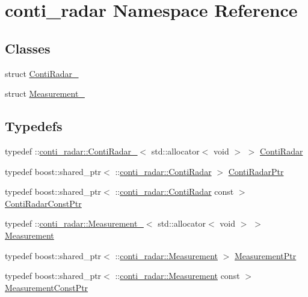 \hypertarget{namespaceconti__radar}{}\section{conti\+\_\+radar Namespace Reference}
\label{namespaceconti__radar}
\subsection*{Classes}
\begin{DoxyCompactItemize}
\item 
struct \hyperlink{structconti__radar_1_1ContiRadar__}{Conti\+Radar\+\_\+}
\item 
struct \hyperlink{structconti__radar_1_1Measurement__}{Measurement\+\_\+}
\end{DoxyCompactItemize}
\subsection*{Typedefs}
\begin{DoxyCompactItemize}
\item 
typedef \+::\hyperlink{structconti__radar_1_1ContiRadar__}{conti\+\_\+radar\+::\+Conti\+Radar\+\_\+}$<$ std\+::allocator$<$ void $>$ $>$ \hyperlink{namespaceconti__radar_ab623e85ee56152c6974f390836e6752b}{Conti\+Radar}
\item 
typedef boost\+::shared\+\_\+ptr$<$ \+::\hyperlink{namespaceconti__radar_ab623e85ee56152c6974f390836e6752b}{conti\+\_\+radar\+::\+Conti\+Radar} $>$ \hyperlink{namespaceconti__radar_accbaddd07d13dedcfd159bf6ce03640e}{Conti\+Radar\+Ptr}
\item 
typedef boost\+::shared\+\_\+ptr$<$ \+::\hyperlink{namespaceconti__radar_ab623e85ee56152c6974f390836e6752b}{conti\+\_\+radar\+::\+Conti\+Radar} const  $>$ \hyperlink{namespaceconti__radar_ab3037b9355b5169ae9ddf4f993cd91ae}{Conti\+Radar\+Const\+Ptr}
\item 
typedef \+::\hyperlink{structconti__radar_1_1Measurement__}{conti\+\_\+radar\+::\+Measurement\+\_\+}$<$ std\+::allocator$<$ void $>$ $>$ \hyperlink{namespaceconti__radar_a89a4c51c8eaeb98be9a074f53e585df1}{Measurement}
\item 
typedef boost\+::shared\+\_\+ptr$<$ \+::\hyperlink{namespaceconti__radar_a89a4c51c8eaeb98be9a074f53e585df1}{conti\+\_\+radar\+::\+Measurement} $>$ \hyperlink{namespaceconti__radar_af28899e00f1d9b7cec43a270c8ba25f9}{Measurement\+Ptr}
\item 
typedef boost\+::shared\+\_\+ptr$<$ \+::\hyperlink{namespaceconti__radar_a89a4c51c8eaeb98be9a074f53e585df1}{conti\+\_\+radar\+::\+Measurement} const  $>$ \hyperlink{namespaceconti__radar_ae267646599157e26315eb50600c57bff}{Measurement\+Const\+Ptr}
\end{DoxyCompactItemize}
